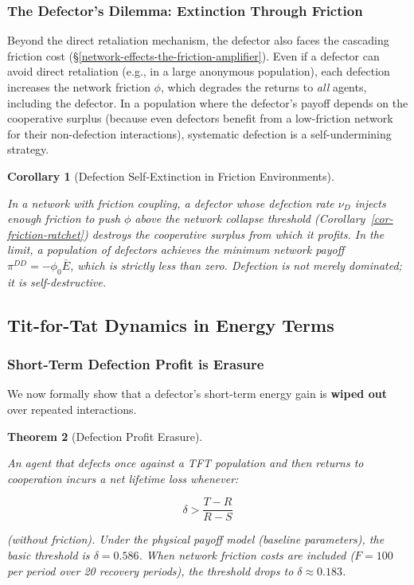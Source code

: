\documentclass[11pt]{article}
\theoremstyle{plain}
\newtheorem{theorem}{Theorem}
\newtheorem{corollary}[theorem]{Corollary}
\theoremstyle{definition}
\theoremstyle{remark}
\let\origsubsection\subsection
\renewcommand{\subsection}{\needspace{7\baselineskip}\origsubsection}
\let\origsubsubsection\subsubsection
\renewcommand{\subsubsection}{\needspace{4\baselineskip}\origsubsubsection}
\begin{document}
\subsubsection{The Defector's Dilemma: Extinction Through
Friction}\label{the-defectors-dilemma-extinction-through-friction}

Beyond the direct retaliation mechanism, the defector also faces the
cascading friction cost (§\ref{network-effects-the-friction-amplifier}).
Even if a defector can avoid direct retaliation (e.g., in a large
anonymous population), each defection increases the network friction
\(\phi\), which degrades the returns to \emph{all} agents, including the
defector. In a population where the defector's payoff depends on the
cooperative surplus (because even defectors benefit from a low-friction
network for their non-defection interactions), systematic defection is a
self-undermining strategy.

\begin{corollary}[Defection Self-Extinction in Friction Environments]
\label{cor-defection-self-extinction}

In a network with friction coupling, a defector whose defection rate $\nu_D$ injects enough friction to push $\phi$ above the network collapse threshold (Corollary~\ref{cor-friction-ratchet}) destroys the cooperative surplus from which it profits. In the limit, a population of defectors achieves the minimum network payoff $\pi^{DD} = -\phi_0 \bar{E}$, which is strictly less than zero. Defection is not merely dominated; it is self-destructive.
\end{corollary}

\subsection{Tit-for-Tat Dynamics in Energy
Terms}\label{tit-for-tat-dynamics-in-energy-terms}

\subsubsection{Short-Term Defection Profit is
Erasure}\label{short-term-defection-profit-is-erasure}

We now formally show that a defector's short-term energy gain is
\textbf{wiped out} over repeated interactions.

\begin{theorem}[Defection Profit Erasure]
\label{thm-defection-profit-erasure}

An agent that defects once against a TFT population and then returns to cooperation incurs a net lifetime loss whenever:

$$\delta > \frac{T - R}{R - S}$$

(without friction). Under the physical payoff model (baseline parameters), the basic threshold is $\delta = 0.586$. When network friction costs are included ($F = 100$ per period over 20 recovery periods), the threshold drops to $\delta \approx 0.183$.
\end{theorem}
\end{document}

